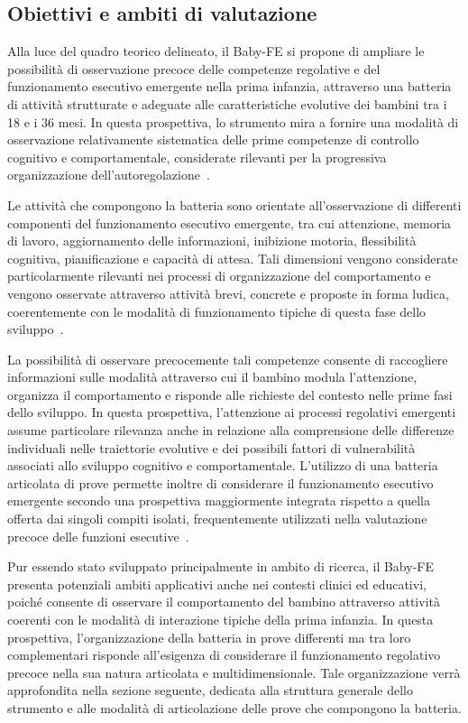         \subsection{Obiettivi e ambiti di valutazione}
        \label{sec:3_7_2}

            Alla luce del quadro teorico delineato, il Baby-FE si propone di ampliare le possibilità di osservazione precoce delle competenze regolative e del funzionamento esecutivo emergente nella prima infanzia, attraverso una batteria di attività strutturate e adeguate alle caratteristiche evolutive dei bambini tra i 18 e i 36 mesi. In questa prospettiva, lo strumento mira a fornire una modalità di osservazione relativamente sistematica delle prime competenze di controllo cognitivo e comportamentale, considerate rilevanti per la progressiva organizzazione dell'autoregolazione~\cite{blair2015,diamond2013}.

            Le attività che compongono la batteria sono orientate all'osservazione di differenti componenti del funzionamento esecutivo emergente, tra cui attenzione, memoria di lavoro, aggiornamento delle informazioni, inibizione motoria, flessibilità cognitiva, pianificazione e capacità di attesa. Tali dimensioni vengono considerate particolarmente rilevanti nei processi di organizzazione del comportamento e vengono osservate attraverso attività brevi, concrete e proposte in forma ludica, coerentemente con le modalità di funzionamento tipiche di questa fase dello sviluppo~\cite{garon2008,diamond2013}.

            La possibilità di osservare precocemente tali competenze consente di raccogliere informazioni sulle modalità attraverso cui il bambino modula l'attenzione, organizza il comportamento e risponde alle richieste del contesto nelle prime fasi dello sviluppo. In questa prospettiva, l'attenzione ai processi regolativi emergenti assume particolare rilevanza anche in relazione alla comprensione delle differenze individuali nelle traiettorie evolutive e dei possibili fattori di vulnerabilità associati allo sviluppo cognitivo e comportamentale. L'utilizzo di una batteria articolata di prove permette inoltre di considerare il funzionamento esecutivo emergente secondo una prospettiva maggiormente integrata rispetto a quella offerta dai singoli compiti isolati, frequentemente utilizzati nella valutazione precoce delle funzioni esecutive~\cite{miyake2000,friedman2017}.

            Pur essendo stato sviluppato principalmente in ambito di ricerca, il Baby-FE presenta potenziali ambiti applicativi anche nei contesti clinici ed educativi, poiché consente di osservare il comportamento del bambino attraverso attività coerenti con le modalità di interazione tipiche della prima infanzia. In questa prospettiva, l'organizzazione della batteria in prove differenti ma tra loro complementari risponde all'esigenza di considerare il funzionamento regolativo precoce nella sua natura articolata e multidimensionale. Tale organizzazione verrà approfondita nella sezione seguente, dedicata alla struttura generale dello strumento e alle modalità di articolazione delle prove che compongono la batteria.

